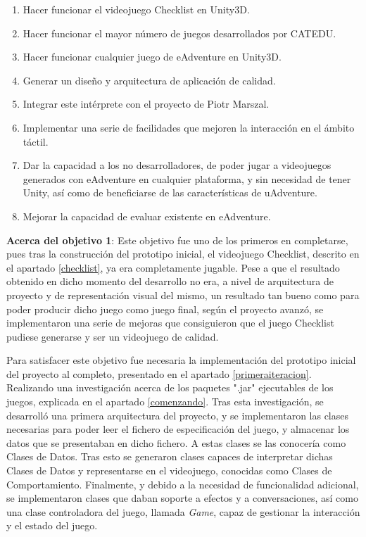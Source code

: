 \begin{enumerate}
	\item Hacer funcionar el videojuego Checklist en Unity3D.
	
	\item Hacer funcionar el mayor número de juegos desarrollados por CATEDU.
	
	\item Hacer funcionar cualquier juego de eAdventure en Unity3D.
	
	\item Generar un diseño y arquitectura de aplicación de calidad.
	
	\item Integrar este intérprete con el proyecto de Piotr Marszal.
	
	\item Implementar una serie de facilidades que mejoren la interacción en el ámbito táctil.
	
	\item Dar la capacidad a los no desarrolladores, de poder jugar a videojuegos generados con eAdventure en cualquier plataforma, y sin necesidad de tener Unity, así como de beneficiarse de las características de uAdventure.
	
	\item Mejorar la capacidad de evaluar existente en eAdventure.
\end{enumerate}

\textbf{Acerca del objetivo 1}: Este objetivo fue uno de los primeros en completarse, pues tras la construcción del prototipo inicial, el videojuego Checklist, descrito en el apartado \ref{checklist}, ya era completamente jugable. Pese a que el resultado obtenido en dicho momento del desarrollo no era, a nivel de arquitectura de proyecto y de representación visual del mismo, un resultado tan bueno como para poder producir dicho juego como juego final, según el proyecto avanzó, se implementaron una serie de mejoras que consiguieron que el juego Checklist pudiese generarse y ser un videojuego de calidad.

Para satisfacer este objetivo fue necesaria la implementación del prototipo inicial del proyecto al completo, presentado en el apartado \ref{primeraiteracion}. Realizando una investigación acerca de los paquetes ".jar" ejecutables de los juegos, explicada en el apartado \ref{comenzando}. Tras esta investigación, se desarrolló una primera arquitectura del proyecto, y se implementaron las clases necesarias para poder leer el fichero de especificación del juego, y almacenar los datos que se presentaban en dicho fichero. A estas clases se las conocería como Clases de Datos. Tras esto se generaron clases capaces de interpretar dichas Clases de Datos y representarse en el videojuego, conocidas como Clases de Comportamiento. Finalmente, y debido a la necesidad de funcionalidad adicional, se implementaron clases que daban soporte a efectos y a conversaciones, así como una clase controladora del juego, llamada \textit{Game}, capaz de gestionar la interacción y el estado del juego.

